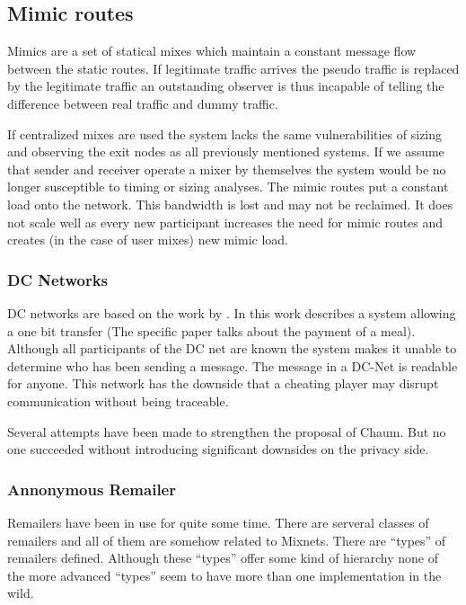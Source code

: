 
\subsection{Mimic routes}
Mimics are a set of statical mixes which maintain a constant message flow between the static routes. If legitimate traffic arrives the pseudo traffic is replaced by the legitimate traffic an outstanding observer is thus incapable of telling the difference between real traffic and dummy traffic.

If centralized mixes are used the system lacks the same vulnerabilities of sizing and observing the exit nodes as all previously mentioned systems. If we assume that sender and receiver operate a mixer by themselves the system would be no longer susceptible to timing or sizing analyses. The mimic routes put a constant load onto the network. This bandwidth is lost and may not be reclaimed. It does not scale well as every new participant increases the need for mimic routes and creates (in the case of user mixes) new mimic load.

\subsubsection{DC Networks}
DC networks are based on the work  by \citeauthor{chaum-dc}\cite{chaum-dc}. In this work \citeauthor{chaum-dc} describes a system allowing a one bit transfer (The specific paper talks about the payment of a meal). Although all participants of the DC net are known the system makes it unable to determine who has been sending a message. The message in a DC-Net is readable for anyone. This network has the downside that a cheating player may disrupt communication without being traceable.

Several attempts have been made to strengthen the proposal of Chaum\cite{golle:eurocrypt2004}\cite{disco}. But no one succeeded without introducing significant downsides on the privacy side.

\subsubsection{Annonymous Remailer\label{sec:remailer}}
Remailers have been in use for quite some time. There are serveral classes of remailers and all of them are somehow related to Mixnets. There are ``types'' of remailers defined. Although these ``types'' offer some kind of hierarchy none of the more advanced ``types'' seem to have more than one implementation in the wild. 

